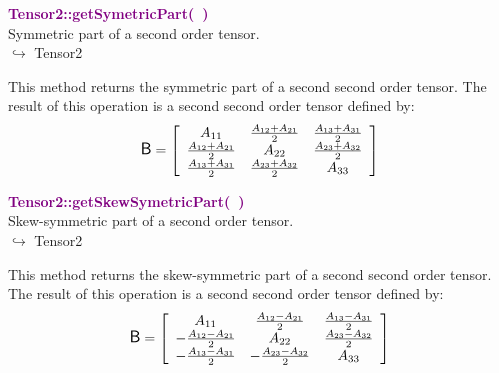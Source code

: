 \textcolor{purple}{\textbf{Tensor2::getSymetricPart(~)}}\label{Tensor2::getSymetricPart()}\\
Symmetric part of a second order tensor.\\ \hspace*{10mm}$\hookrightarrow$ Tensor2

This method returns the symmetric part of a second second order tensor.
The result of this operation is a second second order tensor defined by:
\begin{equation*}
\mbox{\large\ensuremath{\mathsf{B}}} = \left[\begin{array}{ccc}
 A_{11} & \frac{A_{12} + A_{21}}{2} & \frac{A_{13} + A_{31}}{2}\\
 \frac{A_{12} + A_{21}}{2} & A_{22} & \frac {A_{23} + A_{32}}{2}\\
 \frac{A_{13} + A_{31}}{2} & \frac {A_{23} + A_{32}}{2} & A_{33}\end{array}
\right]
\end{equation*}

\textcolor{purple}{\textbf{Tensor2::getSkewSymetricPart(~)}}\label{Tensor2::getSkewSymetricPart()}\\
Skew-symmetric part of a second order tensor.\\ \hspace*{10mm}$\hookrightarrow$ Tensor2

This method returns the skew-symmetric part of a second second order tensor.
The result of this operation is a second second order tensor defined by:
\begin{equation*}
\mbox{\large\ensuremath{\mathsf{B}}} = \left[\begin{array}{ccc}
 A_{11} & \frac{A_{12} - A_{21}}{2} & \frac{A_{13} - A_{31}}{2}\\
 -\frac{A_{12} -  A_{21}}{2} & A_{22} & \frac {A_{23} - A_{32}}{2}\\
 -\frac{A_{13} - A_{31}}{2} & -\frac {A_{23} - A_{32}}{2} & A_{33}\end{array}
\right]
\end{equation*}

